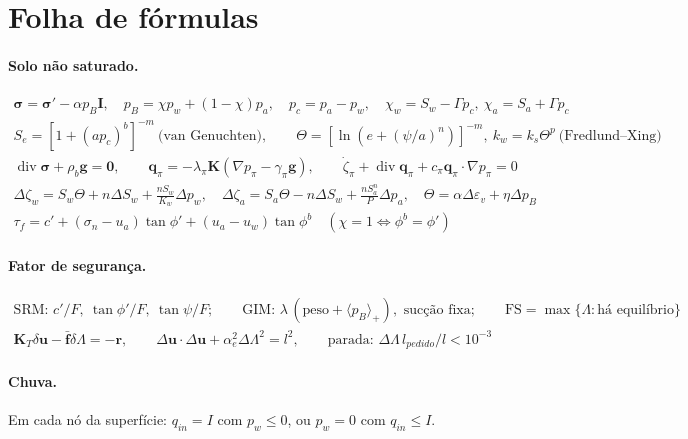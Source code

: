 \section{Folha de fórmulas}
\label{sec:formulas}

\paragraph{Solo não saturado.}
\begin{gather*}
  \bm\sigma = \bm\sigma' - \alpha p_B\bm I, \quad p_B = \chi p_w + (1 - \chi)p_a, \quad p_c = p_a - p_w, \quad
  \chi_w = S_w - \Gamma p_c, \ \chi_a = S_a + \Gamma p_c \\
  S_e = [1 + (a p_c)^b]^{-m} \ \text{(van Genuchten)}, \qquad
  \Theta = [\ln(e + (\psi/a)^n)]^{-m}, \ k_w = k_s\Theta^p \ \text{(Fredlund--Xing)} \\
  \operatorname{div}\bm\sigma + \rho_b\bm g = \bm 0, \qquad \bm q_\pi = -\lambda_\pi\bm K(\nabla p_\pi - \gamma_\pi\bm g),
  \qquad \dot\zeta_\pi + \operatorname{div}\bm q_\pi + c_\pi\bm q_\pi\cdot\nabla p_\pi = 0 \\
  \Delta\zeta_w = S_w\Theta + n\Delta S_w + \tfrac{nS_w}{K_w}\Delta p_w, \quad
  \Delta\zeta_a = S_a\Theta - n\Delta S_w + \tfrac{nS_a^n}{P}\Delta p_a, \quad \Theta = \alpha\Delta\varepsilon_v +
  \eta\Delta p_B \\
  \tau_f = c' + (\sigma_n - u_a)\tan\phi' + (u_a - u_w)\tan\phi^b \quad (\chi = 1 \Leftrightarrow \phi^b = \phi')
\end{gather*}

\paragraph{Fator de segurança.}
\begin{gather*}
  \text{SRM: } c'/F,\ \tan\phi'/F,\ \tan\psi/F; \qquad
  \text{GIM: } \lambda\,(\text{peso} + \langle p_B\rangle_+), \text{ sucção fixa}; \qquad
  \text{FS} = \max\{\Lambda : \text{há equilíbrio}\} \\
  \bm K_T\delta\bm u - \bar{\bm f}\delta\Lambda = -\bm r, \qquad
  \Delta\bm u\cdot\Delta\bm u + \alpha_e^2\Delta\Lambda^2 = l^2, \qquad
  \text{parada: } \Delta\Lambda\, l_{pedido}/l < 10^{-3}
\end{gather*}

\paragraph{Chuva.} Em cada nó da superfície: $q_{in} = I$ com $p_w \leq 0$, ou $p_w = 0$ com $q_{in} \leq I$.

